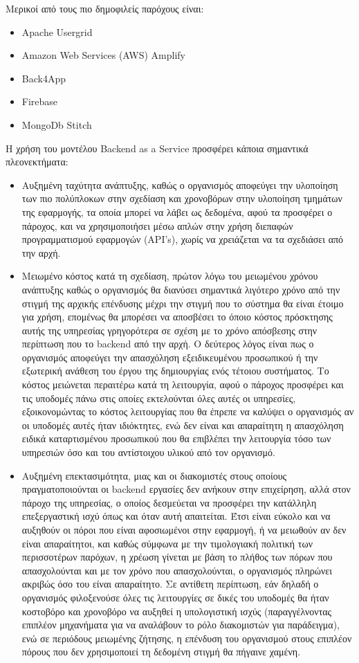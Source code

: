 \documentclass{article}
\begin{document}
Μερικοί από τους πιο δημοφιλείς παρόχους είναι:
\begin{itemize}
\item Apache Usergrid
\item Amazon Web Services (AWS) Amplify
\item Back4App
\item Firebase
\item MongoDb Stitch
\end{itemize}
Η χρήση του μοντέλου Backend as a Service προσφέρει κάποια σημαντικά πλεονεκτήματα:
\begin{itemize}
\item Αυξημένη ταχύτητα ανάπτυξης, καθώς ο οργανισμός αποφεύγει την υλοποίηση των πιο πολύπλοκων στην σχεδίαση και χρονοβόρων στην υλοποίηση τμημάτων της εφαρμογής, τα οποία μπορεί να λάβει ως δεδομένα, αφού τα προσφέρει ο πάροχος, και να χρησιμοποιήσει μέσω απλών στην χρήση διεπαφών προγραμματισμού εφαρμογών (API’s), χωρίς να χρειάζεται να τα σχεδιάσει από την αρχή.
\item Μειωμένο κόστος κατά τη σχεδίαση, πρώτον λόγω του μειωμένου χρόνου ανάπτυξης καθώς ο οργανισμός θα διανύσει σημαντικά λιγότερο χρόνο από την στιγμή της αρχικής επένδυσης μέχρι την στιγμή που το σύστημα θα είναι έτοιμο για χρήση, επομένως θα μπορέσει να αποσβέσει το όποιο κόστος πρόσκτησης αυτής της υπηρεσίας γρηγορότερα σε σχέση με το χρόνο απόσβεσης στην περίπτωση που το backend από την αρχή. Ο δεύτερος λόγος είναι πως ο οργανισμός αποφεύγει την απασχόληση εξειδικευμένου προσωπικού ή την εξωτερική ανάθεση του έργου της δημιουργίας ενός τέτοιου συστήματος. Το κόστος μειώνεται περαιτέρω κατά τη λειτουργία, αφού ο πάροχος προσφέρει και τις υποδομές πάνω στις οποίες εκτελούνται όλες αυτές οι υπηρεσίες, εξοικονομώντας το κόστος λειτουργίας που θα έπρεπε να καλύψει ο οργανισμός αν οι υποδομές αυτές ήταν ιδιόκτητες, ενώ δεν είναι και απαραίτητη η απασχόληση ειδικά καταρτισμένου προσωπικού που θα επιβλέπει την λειτουργία τόσο των υπηρεσιών όσο και του αντίστοιχου υλικού από τον οργανισμό.
\item Αυξημένη επεκτασιμότητα, μιας και οι διακομιστές στους οποίους πραγματοποιούνται οι backend εργασίες δεν ανήκουν στην επιχείρηση, αλλά στον πάροχο της υπηρεσίας, ο οποίος δεσμεύεται να προσφέρει την κατάλληλη επεξεργαστική ισχύ όπως και όταν αυτή απαιτείται. Έτσι είναι εύκολο και να αυξηθούν οι πόροι που είναι αφοσιωμένοι στην εφαρμογή, ή να μειωθούν αν δεν είναι απαραίτητοι, και καθώς σύμφωνα με την τιμολογιακή πολιτική των περισσοτέρων παρόχων, η χρέωση γίνεται με βάση το πλήθος των πόρων που απασχολούνται και με τον χρόνο που απασχολούνται, ο οργανισμός πληρώνει ακριβώς όσο του είναι απαραίτητο. Σε αντίθετη περίπτωση, εάν δηλαδή ο οργανισμός φιλοξενούσε όλες τις λειτουργίες σε δικές του υποδομές θα ήταν κοστοβόρο και χρονοβόρο να αυξηθεί η υπολογιστική ισχύς (παραγγέλνοντας επιπλέον μηχανήματα για να αναλάβουν το ρόλο διακομιστών για παράδειγμα), ενώ σε περιόδους μειωμένης ζήτησης, η επένδυση του οργανισμού στους επιπλέον πόρους που δεν χρησιμοποιεί τη δεδομένη στιγμή θα πήγαινε χαμένη.

\end{itemize}
\end{document}
